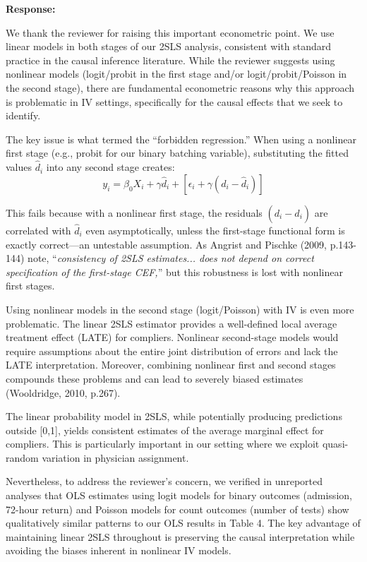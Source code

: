 \documentclass[11pt]{article}
\newcommand{\1}{\hbox{\rm 1\kern-.35em 1}}
\begin{document}
{{{{\noindent\textbf{Response:} \color{blue} {We thank the reviewer for raising this important econometric point. We use linear models in both stages of our 2SLS analysis, consistent with standard practice in the causal inference literature. While the reviewer suggests using nonlinear models (logit/probit in the first stage and/or logit/probit/Poisson in the second stage), there are fundamental econometric reasons why this approach is problematic in IV settings, specifically for the causal effects that we seek to identify.

The key issue is what \cite{Hausman1975, Hausman1978} termed the ``forbidden regression.'' When using a nonlinear first stage (e.g., probit for our binary batching variable), substituting the fitted values $\hat{d}_i$ into any second stage creates:
$$y_i = \beta_0 X_i + \gamma \hat{d}_i + [\epsilon_i + \gamma(d_i - \hat{d}_i)]$$

This fails because with a nonlinear first stage, the residuals $(d_i - \hat{d}_i)$ are correlated with $\hat{d}_i$ even asymptotically, unless the first-stage functional form is exactly correct—an untestable assumption. As Angrist and Pischke (2009, p.143-144) note, ``\textit{consistency of 2SLS estimates... does not depend on correct specification of the first-stage CEF,}'' but this robustness is lost with nonlinear first stages.

Using nonlinear models in the second stage (logit/Poisson) with IV is even more problematic. The linear 2SLS estimator provides a well-defined local average treatment effect (LATE) for compliers. Nonlinear second-stage models would require assumptions about the entire joint distribution of errors and lack the LATE interpretation. Moreover, combining nonlinear first and second stages compounds these problems and can lead to severely biased estimates (Wooldridge, 2010, p.267).

The linear probability model in 2SLS, while potentially producing predictions outside [0,1], yields consistent estimates of the average marginal effect for compliers. This is particularly important in our setting where we exploit quasi-random variation in physician assignment.

Nevertheless, to address the reviewer's concern, we verified in unreported analyses that OLS estimates using logit models for binary outcomes (admission, 72-hour return) and Poisson models for count outcomes (number of tests) show qualitatively similar patterns to our OLS results in Table 4. The key advantage of maintaining linear 2SLS throughout is preserving the causal interpretation while avoiding the biases inherent in nonlinear IV models.}


}}}}
\end{document}
